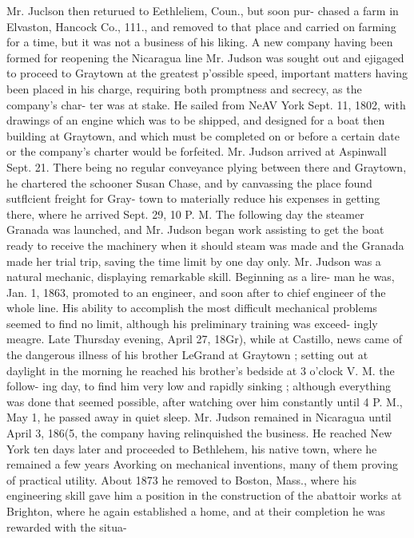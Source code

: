 \documentclass[oneside]{book}
\begin{document}
Mr. Juclson then returued to Eethleliem, Coun., but soon pur- 
chased a farm in Elvaston, Hancock Co., 111., and removed to 
that place and carried on farming for a time, but it was not a 
business of his liking. A new company having been formed 
for reopening the Nicaragua line Mr. Judson was sought out 
and ejigaged to proceed to Graytown at the greatest p'ossible 
speed, important matters having been placed in his charge, 
requiring both promptness and secrecy, as the company's char- 
ter was at stake. He sailed from NeAV York Sept. 11, 1802, 
with drawings of an engine which was to be shipped, and 
designed for a boat then building at Graytown, and which must 
be completed on or before a certain date or the company's 
charter would be forfeited. Mr. Judson arrived at Aspinwall 
Sept. 21. There being no regular conveyance plying between 
there and Graytown, he chartered the schooner Susan Chase, 
and by canvassing the place found sutflcient freight for Gray- 
town to materially reduce his expenses in getting there, where 
he arrived Sept. 29, 10 P. M. The following day the steamer 
Granada was launched, and Mr. Judson began work assisting 
to get the boat ready to receive the machinery when it should 
steam was made and the Granada made her trial trip, saving 
the time limit by one day only. Mr. Judson was a natural 
mechanic, displaying remarkable skill. Beginning as a lire- 
man he was, Jan. 1, 1863, promoted to an engineer, and soon 
after to chief engineer of the whole line. His ability to 
accomplish the most difficult mechanical problems seemed to 
find no limit, although his preliminary training was exceed- 
ingly meagre. Late Thursday evening, April 27, 18Gr), while 
at Castillo, news came of the dangerous illness of his brother 
LeGrand at Graytown ; setting out at daylight in the morning 
he reached his brother's bedside at 3 o'clock V. M. the follow- 
ing day, to find him very low and rapidly sinking ; although 
everything was done that seemed possible, after watching over 
him constantly until 4 P. M., May 1, he passed away in quiet 
sleep. Mr. Judson remained in Nicaragua until April 3, 186(5, 
the company having relinquished the business. He reached 
New York ten days later and proceeded to Bethlehem, his 
native town, where he remained a few years Avorking on 
mechanical inventions, many of them proving of practical 
utility. About 1873 he removed to Boston, Mass., where his 
engineering skill gave him a position in the construction of 
the abattoir works at Brighton, where he again established a 
home, and at their completion he was rewarded with the situa- 
\end{document}
